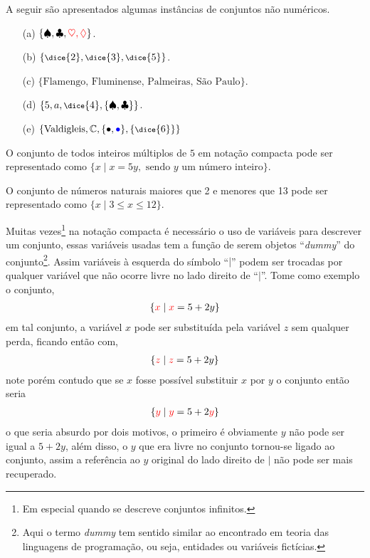 \begin{exemplo}\label{exe:SetBuilder2}
  A seguir são apresentados algumas instâncias de conjuntos não numéricos.
  \begin{itemize}
    \item[(a)] $\{\spadesuit, \clubsuit, {\color{red} \heartsuit, \lozenge}\}$.
    \item[(b)] $\{{\footnotesize \dice{2}, \dice{3}, \dice{5}}\}$.
    \item[(c)] $\{\mbox{Flamengo, Fluminense, Palmeiras, São Paulo}\}$.
    \item[(d)] $\{5, a, {\footnotesize\dice{4}}, \{\spadesuit, \clubsuit\}\}$.
    \item[(e)] $\{\text{Valdigleis}, \mathbb{C}, \{\bullet, {\color{blue}\bullet}\}, \{{\footnotesize\dice{6}} \}\}$
  \end{itemize}
\end{exemplo}

\begin{exemplo}\label{exe:SetBuilder3}
  O conjunto de todos inteiros múltiplos de $5$ em notação compacta pode ser representado como $\{x \mid x = 5y, \text{ sendo $y$ um número inteiro}\}$.
\end{exemplo}

\begin{exemplo}\label{exe:SetBuilder4}
  O conjunto de números naturais maiores que 2 e menores que 13 pode ser representado como  $\{x \mid 3 \leq x \leq 12\}$.
\end{exemplo}

\begin{nota}\label{note:DummyEmConjunto}
  Muitas vezes\footnote{Em especial quando se descreve conjuntos infinitos.} na notação compacta é necessário o uso de variáveis para descrever um conjunto, essas variáveis usadas tem a função de serem objetos ``\textit{dummy}'' do conjunto\footnote{Aqui o termo \textit{dummy} tem sentido similar ao encontrado em teoria das linguagens de programação, ou seja, entidades ou variáveis fictícias.}. Assim variáveis à esquerda do símbolo ``$\mid$'' podem ser trocadas por qualquer variável que não ocorre livre no lado direito de ``$\mid$''. Tome como exemplo o conjunto, 
  \begin{eqnarray*}
    \{{\color{red}x} \mid {\color{red}x} = 5 + 2y\}
  \end{eqnarray*}
  em tal conjunto, a variável $x$ pode ser substituída pela variável $z$ sem qualquer perda, ficando então com,
  \begin{eqnarray*}
    \{{\color{red}z} \mid {\color{red}z} = 5 + 2y\}
  \end{eqnarray*}
  note porém contudo que se $x$ fosse possível substituir $x$ por $y$ o conjunto então seria
  \begin{eqnarray*}
    \{{\color{red}y} \mid {\color{red}y} = 5 + 2{\color{red}y}\}
  \end{eqnarray*}
  o que seria absurdo por dois motivos, o primeiro é obviamente $y$ não pode ser igual a $5 + 2y$, além disso, o $y$ que era livre no conjunto tornou-se ligado ao conjunto, assim a referência ao $y$ original do lado direito de $\mid$ não pode ser mais recuperado.
\end{nota}

